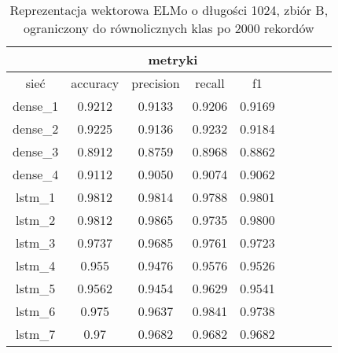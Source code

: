 \begin{table}[p] \label{tab:wyniki_elmo_B_lim} \centering
    \caption{Reprezentacja wektorowa ELMo o długości 1024, zbiór B, ograniczony do równolicznych klas po 2000 rekordów}
    \label{tab:wyniki_1024_eks3}
    \begin{tabular} {|c|c|c|c|c|c|c|c|c| }    \hline
                 & \multicolumn{4}{c|}{metryki}                                                                                  \\ \hline
        sieć     & accuracy                     & precision             & recall                     & f1                        \\ \hline
        dense\_1 & 0.9212                       & 0.9133                & 0.9206                     & 0.9169                    \\ \hline
        dense\_2 & 0.9225                       & 0.9136                & 0.9232                     & 0.9184                    \\ \hline
        dense\_3 & 0.8912                       & 0.8759                & 0.8968                     & 0.8862                    \\ \hline
        dense\_4 & 0.9112                       & 0.9050                & 0.9074                     & 0.9062                    \\ \hline
        lstm\_1  & 0.9812                       & 0.9814                & 0.9788                     & 0.9801                    \\ \hline
        lstm\_2  & 0.9812                       & 0.9865                & 0.9735                     & 0.9800                    \\ \hline
        lstm\_3  & 0.9737                       & 0.9685                & 0.9761                     & 0.9723                    \\ \hline
        lstm\_4  & 0.955                        & 0.9476                & 0.9576                     & 0.9526                    \\ \hline
        lstm\_5  & 0.9562                       & 0.9454                & 0.9629                     & 0.9541                    \\ \hline
        lstm\_6  & 0.975                        & 0.9637                & 0.9841                     & 0.9738                    \\ \hline
        lstm\_7  & 0.97                         & 0.9682                & 0.9682                     & 0.9682                    \\ \hline

\end{tabular}
\end{table}
